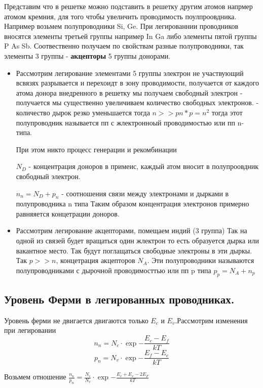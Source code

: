 \documentclass[../main.tex]{subfiles}
\begin{document}
Представим что в решетке можно подставить в решетку другим атомов напрмер атомом кремния, для того чтобы увеличить проводимость поулпроовдника.
Например возьмем полупроводники Si, Ge. При легированнии проводников вносятся элементы третьей группы например In Ga либо элементы пятой группы P As Sb.
Соотвественно получаем по свойствам разные полупроводники, так элементы 3 группы - \textbf{акцепторы} 5 группы донорами.
\begin{itemize}
    \item Рассмотрим легирование элементами 5 группы
    электрон не участвующий  всвязях разрывается и перехоидт в зону проводимости, получается от каждого атома донора внедренного в решетку мы получаем свободный электрон - получается мы существенно 
увеличиваем количество свободных электронов. - количество дырок резко уменьшается  тогда $n >> p n * p = n^2$ 
 тогда этот полупроводник называется пп с жлектронноый проводимостью или пп n-типа.

 При этом никто процесс генерации и рекомбинации 

 $N_D$ - концентрация доноров в примеис, каждый атом вносит в полупроовдник свободный электрон.

 $n_n = N_D +p_n$ - соотношения связи между электронами и дырками в полупроводника n типа
 Таким образом концентрация электронов примерно равняяется концетрации доноров.

    \item Рассмотрим легирование акцепторами, помещаем индий (3 группа)
    Так на одной из связей будет вращаться один жлектрон то есть образуется дырка или вакантное место. Так будут поглащаться свободные электроны в эти дыркы.
    Так $p >> n$, концетрация акцепторов $N_A$. Эти полупроводники называются полупроводниками с дырочной проводимосттью или пп p типа $p_p = N_A + n_p$

\end{itemize}

\subsection{Уровень Ферми в легированных проводниках.}

Уровень ферми не двигается двигаются только  $E_c$ и $E_v$.Рассмотрим изменения при легировании 
\[ n_n = N_c \cdot \exp{-\frac{E_c - E_f}{kT}} \]
\[ p_n = N_v \cdot \exp{-\frac{E_f - E_c}{kT}} \]

Возьмем отношение $\frac{n_n}{p_n} = \frac{N_c}{N_v} \cdot \exp{- \frac{E_c + E_v - 2E_F}{kT}}$
\end{document}
